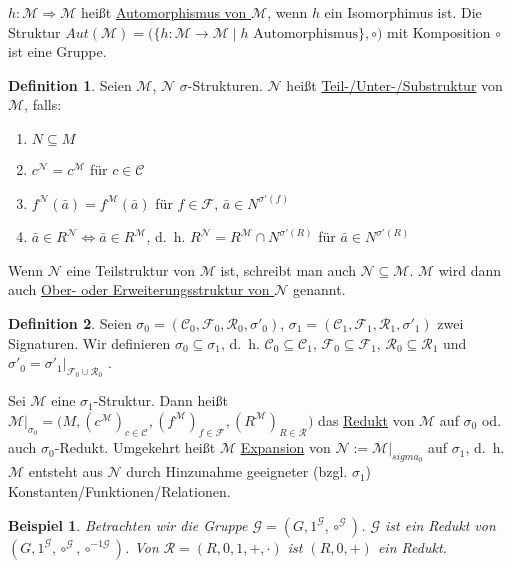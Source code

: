 \documentclass{article}
\theoremstyle{definition}
\newtheorem{dfn}{Definition}[section]
\theoremstyle{plain}
\newtheorem*{bsp}{Beispiel}
\newcommand{\calC}{\mathcal{C}}
\newcommand{\calF}{\mathcal{F}}
\newcommand{\calG}{\mathcal{G}}
\newcommand{\calM}{\mathcal{M}}
\newcommand{\calN}{\mathcal{N}}
\newcommand{\calR}{\mathcal{R}}
\newcommand{\sign}[1]{(\calC_{#1}, \calF_{#1}, \calR_{#1}, \sigma'_{#1})}
\newcommand{\struc}[3]{\big(#1, (c^{#2})_{c \in \calC_{#3}}, (f^{#2})_{f \in \calF_{#3}}, (R^{#2})_{R \in \calR_{#3}}\big)}
\begin{document}
    $ h : \calM \Rightarrow \calM $ heißt \underline{Automorphismus von $ \calM $}, wenn $ h $ ein Isomorphimus ist.
    Die Struktur $ Aut(\calM) = \big( \{ h : \calM \rightarrow \calM \mid h \text{ Automorphismus} \}, \circ \big) $ mit Komposition $ \circ $ ist eine Gruppe.

    \begin{dfn}
        Seien $ \calM $, $ \calN $ $\sigma $-Strukturen.
        $ \calN $ heißt \underline{Teil-/Unter-/Substruktur} von $ \calM $, falls:
        \begin{enumerate}
            \item $ N \subseteq M $
            \item $ c^\calN = c^\calM $ für $ c \in \calC $
            \item $ f^\calN(\bar{a}) = f^\calM(\bar{a}) $ für $ f \in \calF $, $ \bar{a} \in N^{\sigma'(f)} $
            \item $ \bar{a} \in R^\calN \Leftrightarrow \bar{a} \in R^\calM $, d.~h. $ R^\calN = R^\calM \cap N^{\sigma'(R)} $ für $ \bar{a} \in N^{\sigma'(R)} $
        \end{enumerate}
    \end{dfn}

    Wenn $ \calN $ eine Teilstruktur von $ \calM $ ist, schreibt man auch $ \calN \subseteq \calM $.
    $ \calM $ wird dann auch \underline{Ober- oder Erweiterungsstruktur von $ \calN $} genannt.

    \begin{dfn}
        Seien $ \sigma_0 = \sign{0} $, $ \sigma_1 = \sign{1} $ zwei Signaturen.
        Wir definieren $ \sigma_0 \subseteq \sigma_1 $, d.~h. $ \calC_0 \subseteq \calC_1 $, $ \calF_0 \subseteq \calF_1 $, $ \calR_0 \subseteq \calR_1 $ und $ \sigma'_0 = \sigma'_1 \vert_{\calF_0 \cup \calR_0} $ .

        Sei $ \calM $ eine $ \sigma_1 $-Struktur.
        Dann heißt $ \calM \vert_{\sigma_0} = \struc{M}{\calM}{} $ das \underline{Redukt} von $ \calM $ auf $ \sigma_0 $ od. auch $ \sigma_0 $-Redukt.
        Umgekehrt heißt $ \calM $ \underline{Expansion} von $ \calN := \calM \vert_{sigma_0} $ auf $ \sigma_1 $, d.~h. $ \calM $ entsteht aus $ \calN $ durch Hinzunahme geeigneter (bzgl. $ \sigma_1 $) Konstanten/Funktionen/Relationen.
    \end{dfn}

    \begin{bsp}
        Betrachten wir die Gruppe $ \calG = (G, 1^\calG, \circ^\calG) $.
        $ \calG $ ist ein Redukt von $ (G, 1^\calG, \circ^\calG, \circ^{-1\calG}) $.
        Von $ \calR = (R, 0, 1, +, \cdot) $ ist $ (R, 0, +) $ ein Redukt.
    \end{bsp}
\end{document}
